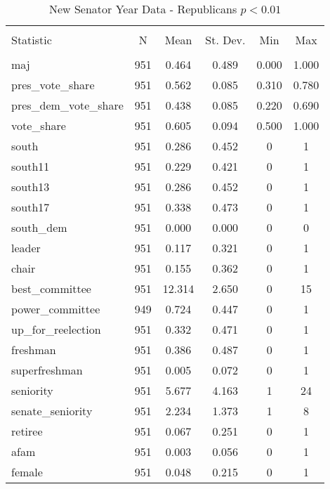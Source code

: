 \documentclass[12pt]{article}
\begin{document}
\begin{table}[!htbp] \centering 
	\caption{New Senator Year Data - Republicans $ p < 0.01 $} 
	\begin{tabular}{@{\extracolsep{5pt}}lccccc} 
		\\[-1.8ex]\hline 
		\hline \\[-1.8ex] 
		Statistic & \multicolumn{1}{c}{N} & \multicolumn{1}{c}{Mean} & \multicolumn{1}{c}{St. Dev.} & \multicolumn{1}{c}{Min} & \multicolumn{1}{c}{Max} \\ 
		\hline \\[-1.8ex]  
		maj & 951 & 0.464 & 0.489 & 0.000 & 1.000 \\ 
		pres\_vote\_share & 951 & 0.562 & 0.085 & 0.310 & 0.780 \\ 
		pres\_dem\_vote\_share & 951 & 0.438 & 0.085 & 0.220 & 0.690 \\ 
		vote\_share & 951 & 0.605 & 0.094 & 0.500 & 1.000 \\ 
		south & 951 & 0.286 & 0.452 & 0 & 1 \\ 
		south11 & 951 & 0.229 & 0.421 & 0 & 1 \\ 
		south13 & 951 & 0.286 & 0.452 & 0 & 1 \\ 
		south17 & 951 & 0.338 & 0.473 & 0 & 1 \\ 
		south\_dem & 951 & 0.000 & 0.000 & 0 & 0 \\ 
		leader & 951 & 0.117 & 0.321 & 0 & 1 \\ 
		chair & 951 & 0.155 & 0.362 & 0 & 1 \\ 
		best\_committee & 951 & 12.314 & 2.650 & 0 & 15 \\ 
		power\_committee & 949 & 0.724 & 0.447 & 0 & 1 \\ 
		up\_for\_reelection & 951 & 0.332 & 0.471 & 0 & 1 \\ 
		freshman & 951 & 0.386 & 0.487 & 0 & 1 \\ 
		superfreshman & 951 & 0.005 & 0.072 & 0 & 1 \\ 
		seniority & 951 & 5.677 & 4.163 & 1 & 24 \\ 
		senate\_seniority & 951 & 2.234 & 1.373 & 1 & 8 \\ 
		retiree & 951 & 0.067 & 0.251 & 0 & 1 \\ 
		afam & 951 & 0.003 & 0.056 & 0 & 1 \\ 
		female & 951 & 0.048 & 0.215 & 0 & 1 \\ 

\end{tabular}
\end{table}
\end{document}
